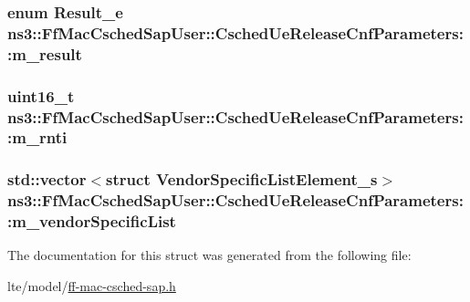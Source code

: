 \subsubsection[{\texorpdfstring{m\+\_\+result}{m_result}}]{\setlength{\rightskip}{0pt plus 5cm}enum {\bf Result\+\_\+e} ns3\+::\+Ff\+Mac\+Csched\+Sap\+User\+::\+Csched\+Ue\+Release\+Cnf\+Parameters\+::m\+\_\+result}\hypertarget{structns3_1_1FfMacCschedSapUser_1_1CschedUeReleaseCnfParameters_ad75458390f83168e277335a1490ed8ff}{}\label{structns3_1_1FfMacCschedSapUser_1_1CschedUeReleaseCnfParameters_ad75458390f83168e277335a1490ed8ff}
\subsubsection[{\texorpdfstring{m\+\_\+rnti}{m_rnti}}]{\setlength{\rightskip}{0pt plus 5cm}uint16\+\_\+t ns3\+::\+Ff\+Mac\+Csched\+Sap\+User\+::\+Csched\+Ue\+Release\+Cnf\+Parameters\+::m\+\_\+rnti}\hypertarget{structns3_1_1FfMacCschedSapUser_1_1CschedUeReleaseCnfParameters_ac2230202bdd83c844ed7d2432f0e586d}{}\label{structns3_1_1FfMacCschedSapUser_1_1CschedUeReleaseCnfParameters_ac2230202bdd83c844ed7d2432f0e586d}
\subsubsection[{\texorpdfstring{m\+\_\+vendor\+Specific\+List}{m_vendorSpecificList}}]{\setlength{\rightskip}{0pt plus 5cm}std\+::vector$<$struct {\bf Vendor\+Specific\+List\+Element\+\_\+s}$>$ ns3\+::\+Ff\+Mac\+Csched\+Sap\+User\+::\+Csched\+Ue\+Release\+Cnf\+Parameters\+::m\+\_\+vendor\+Specific\+List}\hypertarget{structns3_1_1FfMacCschedSapUser_1_1CschedUeReleaseCnfParameters_a5e88906ac051b170b6e315d9d5393338}{}\label{structns3_1_1FfMacCschedSapUser_1_1CschedUeReleaseCnfParameters_a5e88906ac051b170b6e315d9d5393338}


The documentation for this struct was generated from the following file\+:\begin{DoxyCompactItemize}
\item 
lte/model/\hyperlink{ff-mac-csched-sap_8h}{ff-\/mac-\/csched-\/sap.\+h}\end{DoxyCompactItemize}
